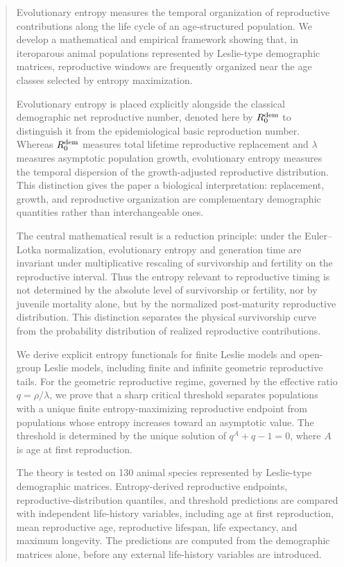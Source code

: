\documentclass[10pt,a4paper]{amsart}
\theoremstyle{definition}
\theoremstyle{remark}
\numberwithin{equation}{section}
\begin{document}
\begin{abstract}
Evolutionary entropy measures the temporal organization of reproductive contributions along the life cycle of an age-structured population. We develop a mathematical and empirical framework showing that, in iteroparous animal populations represented by Leslie-type demographic matrices, reproductive windows are frequently organized near the age classes selected by entropy maximization.

Evolutionary entropy is placed explicitly alongside the classical demographic net reproductive number, denoted here by $R_0^{\rm dem}$ to distinguish it from the epidemiological basic reproduction number. Whereas $R_0^{\rm dem}$ measures total lifetime reproductive replacement and $\lambda$ measures asymptotic population growth, evolutionary entropy measures the temporal dispersion of the growth-adjusted reproductive distribution. This distinction gives the paper a biological interpretation: replacement, growth, and reproductive organization are complementary demographic quantities rather than interchangeable ones.

The central mathematical result is a reduction principle: under the Euler--Lotka normalization, evolutionary entropy and generation time are invariant under multiplicative rescaling of survivorship and fertility on the reproductive interval. Thus the entropy relevant to reproductive timing is not determined by the absolute level of survivorship or fertility, nor by juvenile mortality alone, but by the normalized post-maturity reproductive distribution. This distinction separates the physical survivorship curve from the probability distribution of realized reproductive contributions.

We derive explicit entropy functionals for finite Leslie models and open-group Leslie models, including finite and infinite geometric reproductive tails. For the geometric reproductive regime, governed by the effective ratio $q=\rho/\lambda$, we prove that a sharp critical threshold separates populations with a unique finite entropy-maximizing reproductive endpoint from populations whose entropy increases toward an asymptotic value. The threshold is determined by the unique solution of $q^A+q-1=0$, where $A$ is age at first reproduction.

The theory is tested on 130 animal species represented by Leslie-type demographic matrices. Entropy-derived reproductive endpoints, reproductive-distribution quantiles, and threshold predictions are compared with independent life-history variables, including age at first reproduction, mean reproductive age, reproductive lifespan, life expectancy, and maximum longevity. The predictions are computed from the demographic matrices alone, before any external life-history variables are introduced.


\end{abstract}
\end{document}
